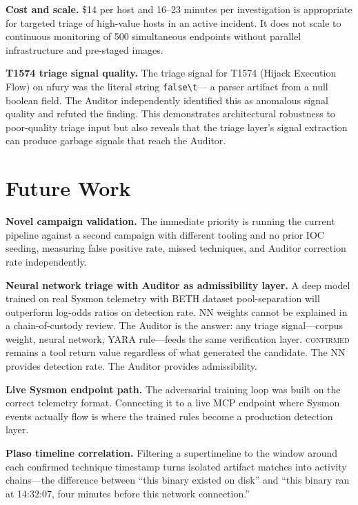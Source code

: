 \documentclass[sigconf, nonacm]{acmart}
\begin{document}
\textbf{Cost and scale.} \$14 per host and 16--23 minutes per investigation is
appropriate for targeted triage of high-value hosts in an active incident. It
does not scale to continuous monitoring of 500 simultaneous endpoints without
parallel infrastructure and pre-staged images.

\textbf{T1574 triage signal quality.} The triage signal for T1574 (Hijack
Execution Flow) on nfury was the literal string \texttt{false\textbackslash t}---
a parser artifact from a null boolean field. The Auditor independently identified
this as anomalous signal quality and refuted the finding. This demonstrates
architectural robustness to poor-quality triage input but also reveals that the
triage layer's signal extraction can produce garbage signals that reach the
Auditor.

\section{Future Work}
\label{sec:future}

\textbf{Novel campaign validation.} The immediate priority is running the current
pipeline against a second campaign with different tooling and no prior IOC
seeding, measuring false positive rate, missed techniques, and Auditor correction
rate independently.

\textbf{Neural network triage with Auditor as admissibility layer.} A deep
model trained on real Sysmon telemetry with BETH dataset pool-separation will
outperform log-odds ratios on detection rate. NN weights cannot be explained in
a chain-of-custody review. The Auditor is the answer: any triage signal---corpus
weight, neural network, YARA rule---feeds the same verification layer.
\textsc{confirmed} remains a tool return value regardless of what generated
the candidate. The NN provides detection rate. The Auditor provides admissibility.

\textbf{Live Sysmon endpoint path.} The adversarial training loop was built on
the correct telemetry format. Connecting it to a live MCP endpoint where Sysmon
events actually flow is where the trained rules become a production detection
layer.

\textbf{Plaso timeline correlation.} Filtering a supertimeline to the window
around each confirmed technique timestamp turns isolated artifact matches into
activity chains---the difference between ``this binary existed on disk'' and
``this binary ran at 14:32:07, four minutes before this network connection.''
\end{document}
